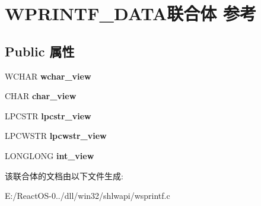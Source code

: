 \hypertarget{union_w_p_r_i_n_t_f___d_a_t_a}{}\section{W\+P\+R\+I\+N\+T\+F\+\_\+\+D\+A\+T\+A联合体 参考}
\label{union_w_p_r_i_n_t_f___d_a_t_a}
\subsection*{Public 属性}
\begin{DoxyCompactItemize}
\item 
\mbox{\label{union_w_p_r_i_n_t_f___d_a_t_a_a13c0da78ff28281b57aa42048577a2c5}} 
W\+C\+H\+AR {\bfseries wchar\+\_\+view}
\item 
\mbox{\label{union_w_p_r_i_n_t_f___d_a_t_a_ae4653f44ec670bc95540b5f54484d6e8}} 
C\+H\+AR {\bfseries char\+\_\+view}
\item 
\mbox{\label{union_w_p_r_i_n_t_f___d_a_t_a_ac90dd736043c1b71dc8427735a28a075}} 
L\+P\+C\+S\+TR {\bfseries lpcstr\+\_\+view}
\item 
\mbox{\label{union_w_p_r_i_n_t_f___d_a_t_a_aafa710b3901a0a6e54af9dbc52246ee2}} 
L\+P\+C\+W\+S\+TR {\bfseries lpcwstr\+\_\+view}
\item 
\mbox{\label{union_w_p_r_i_n_t_f___d_a_t_a_ac542f9217d34d2b9e6d9a6f357de9777}} 
L\+O\+N\+G\+L\+O\+NG {\bfseries int\+\_\+view}
\end{DoxyCompactItemize}


该联合体的文档由以下文件生成\+:\begin{DoxyCompactItemize}
\item 
E\+:/\+React\+O\+S-\/0../dll/win32/shlwapi/wsprintf.\+c\end{DoxyCompactItemize}
